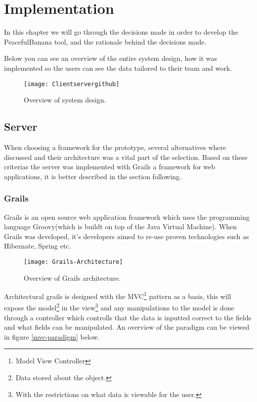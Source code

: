 \chapter{Implementation}
In this chapter we will go through the decisions made in order to develop the PeacefulBanana tool, and the rationale behind the decisions made. 

Below you can see an overview of the entire system design, how it was implemented so the users can see the data tailored to their team and work.

\begin{figure}[htpb!]
    \centering
        \texttt{[image: Clientservergithub]}
    \caption{Overview of system design.}
    \label{ClientServerGithub}
\end{figure}

\section{Server}
When choosing a framework for the prototype, several alternatives where discussed and their architecture was a vital part of the selection. Based on these criterias the server was implemented with Grails a framework for web applications, it is better described in the section following.

\subsection{Grails}
Grails is an open source web application framework which uses the programming language Groovy(which is buildt on top of the Java Virtual Machine). When Grails was developed, it's developers aimed to re-use proven technologies such as Hibernate, Spring etc. 

\begin{figure}[htpb!]
\centering
    \texttt{[image: Grails-Architecture]}
\caption{Overview of Grails architecture.}
\end{figure}

Architectural grails is designed with the MVC\footnote{Model View Controller} pattern as a basis, this will expose the model\footnote{Data stored about the object.} in the view\footnote{With the restrictions on what data is viewable for the user.} and any manipulations to the model is done through a controller which controlls that the data is inputted correct to the fields and what fields can be manipulated. An overview of the paradigm can be viewed in figure \ref{mvc-paradigm} below.

